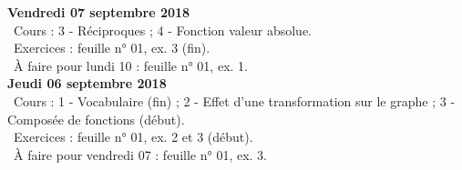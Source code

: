 \documentclass[12pt,a4paper]{article}
\begin{document}
% 
% 
% 
% 
% 
\noindent\textbf{Vendredi 07 septembre 2018}\\
\bu\ Cours : 3 - Réciproques ; 4 - Fonction valeur absolue.\\
\bu\ Exercices : feuille n° 01, ex. 3 (fin).\\
\bu\ À faire pour lundi 10 : feuille n° 01, ex. 1.\vspace{.4cm}\\

\noindent\textbf{\bf Jeudi 06 septembre 2018}\\
\bu\ Cours : 1 - Vocabulaire (fin) ; 2 - Effet d'une transformation sur le graphe ; 3 - Composée de fonctions (début).\\
\bu\ Exercices : feuille n° 01, ex. 2 et 3 (début).\\
\bu\ À faire pour vendredi 07 : feuille n° 01, ex. 3.\vspace{.4cm}\\
    
\end{document}
